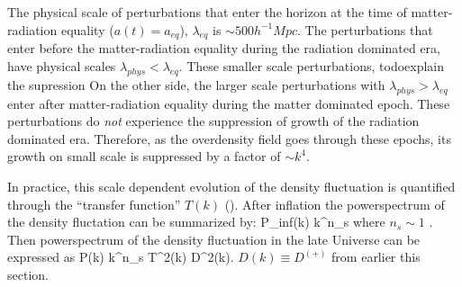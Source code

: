 The physical scale of perturbations that enter the horizon at the time of 
matter-radiation equality ($a(t) = a_{eq}$), $\lambda_{eq}$ is $\sim 500 h^{-1}Mpc$.
The perturbations that enter before the matter-radiation equality during 
the radiation dominated era, have physical scales $\lambda_{phys} < \lambda_{eq}$. 
These smaller scale perturbations, todo{explain the supression} 
On the other side, the larger scale perturbations with $\lambda_{phys} > \lambda_{eq}$
enter after matter-radiation equality during the matter dominated epoch. These 
perturbations do {\em not} experience the suppression of growth of the radiation 
dominated era. Therefore, as the overdensity field goes through these epochs, its 
growth on small scale is suppressed by a factor of $\sim k^4$.  


In practice, this scale dependent evolution of the density fluctuation is 
quantified through the ``transfer function'' $T(k)$ (). After inflation the 
powerspectrum of the density fluctation can be summarized by: 
\beq
P_{inf}(k) \propto k^{n_s}
\eeq
where $n_s \sim 1$ . Then powerspectrum of the density 
fluctuation in the late Universe can be expressed as 
\beq
P(k) \propto k^{n_s} T^2(k) D^2(k). 
\eeq
$D(k) \equiv D^(+)$ from earlier this section. 

